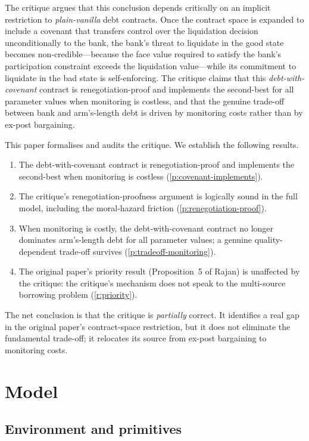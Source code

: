 \documentclass[12pt,a4paper]{article}
\theoremstyle{plain}
\theoremstyle{definition}
\theoremstyle{remark}
\begin{document}
The critique argues that this conclusion depends critically on an implicit restriction to \emph{plain-vanilla} debt contracts. Once the contract space is expanded to include a covenant that transfers control over the liquidation decision unconditionally to the bank, the bank's threat to liquidate in the good state becomes non-credible---because the face value required to satisfy the bank's participation constraint exceeds the liquidation value---while its commitment to liquidate in the bad state is self-enforcing. The critique claims that this \emph{debt-with-covenant} contract is renegotiation-proof and implements the second-best for all parameter values when monitoring is costless, and that the genuine trade-off between bank and arm's-length debt is driven by monitoring costs rather than by ex-post bargaining.

This paper formalises and audits the critique. We establish the following results.

\begin{enumerate}[nosep]
\item The debt-with-covenant contract is renegotiation-proof and implements the second-best when monitoring is costless (\cref{p:covenant-implements}).
\item The critique's renegotiation-proofness argument is logically sound in the full model, including the moral-hazard friction (\cref{p:renegotiation-proof}).
\item When monitoring is costly, the debt-with-covenant contract no longer dominates arm's-length debt for all parameter values; a genuine quality-dependent trade-off survives (\cref{p:tradeoff-monitoring}).
\item The original paper's priority result (Proposition~5 of Rajan) is unaffected by the critique: the critique's mechanism does not speak to the multi-source borrowing problem (\cref{r:priority}).
\end{enumerate}

The net conclusion is that the critique is \emph{partially} correct. It identifies a real gap in the original paper's contract-space restriction, but it does not eliminate the fundamental trade-off; it relocates its source from ex-post bargaining to monitoring costs.

\section{Model}
\label{sec:model}

\subsection{Environment and primitives}
\end{document}

